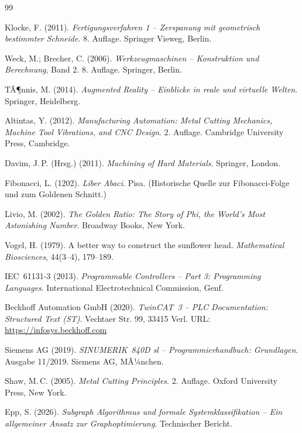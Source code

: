 ﻿\documentclass[12pt,a4paper]{article}
\begin{document}
\renewcommand{\refname}{Literaturverzeichnis}
\begin{thebibliography}{99}

Klocke, F. (2011).
\textit{Fertigungsverfahren 1 -- Zerspanung mit geometrisch bestimmter Schneide}.
8. Auflage. Springer Vieweg, Berlin.

Weck, M.; Brecher, C. (2006).
\textit{Werkzeugmaschinen -- Konstruktion und Berechnung}, Band 2.
8. Auflage. Springer, Berlin.

TÃ¶nnis, M. (2014).
\textit{Augmented Reality -- Einblicke in reale und virtuelle Welten}.
Springer, Heidelberg.

Altintas, Y. (2012).
\textit{Manufacturing Automation: Metal Cutting Mechanics, Machine Tool Vibrations, and CNC Design}.
2. Auflage. Cambridge University Press, Cambridge.

Davim, J.\,P. (Hrsg.) (2011).
\textit{Machining of Hard Materials}.
Springer, London.

Fibonacci, L. (1202).
\textit{Liber Abaci}.
Pisa. (Historische Quelle zur Fibonacci-Folge und zum Goldenen Schnitt.)

Livio, M. (2002).
\textit{The Golden Ratio: The Story of Phi, the World's Most Astonishing Number}.
Broadway Books, New York.

Vogel, H. (1979).
A better way to construct the sunflower head.
\textit{Mathematical Biosciences}, 44(3--4), 179--189.

IEC~61131-3 (2013).
\textit{Programmable Controllers -- Part 3: Programming Languages}.
International Electrotechnical Commission, Genf.

Beckhoff Automation GmbH (2020).
\textit{TwinCAT~3 -- PLC Documentation: Structured Text (ST)}.
Vechtaer Str. 99, 33415 Verl.
URL: \url{https://infosys.beckhoff.com}

Siemens AG (2019).
\textit{SINUMERIK~840D sl -- Programmierhandbuch: Grundlagen}.
Ausgabe 11/2019. Siemens AG, MÃ¼nchen.

Shaw, M.\,C. (2005).
\textit{Metal Cutting Principles}.
2. Auflage. Oxford University Press, New York.

Epp, S. (2026).
\textit{Subgraph Algorithmus und formale Systemklassifikation -- Ein allgemeiner Ansatz zur Graphoptimierung}.
Technischer Bericht.

\end{thebibliography}
\end{document}
